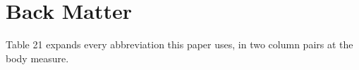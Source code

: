 \section*{Back Matter}


Table 21 expands every abbreviation this paper uses, in two column pairs at the
body measure.

